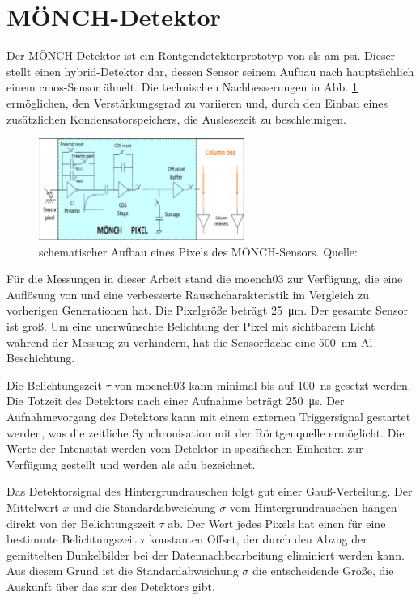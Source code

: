 \section{MÖNCH-Detektor}
\label{text:moench_theorie}
Der MÖNCH-Detektor ist ein Röntgendetektorprototyp von \gls{sls} am \gls{psi}. Dieser stellt einen hybrid-Detektor dar, dessen Sensor seinem Aufbau nach hauptsächlich einem \gls{cmos}-Sensor ähnelt. Die technischen Nachbesserungen in Abb. \ref{fig:moench_pixel} ermöglichen, den Verstärkungsgrad zu variieren und, durch den Einbau eines zusätzlichen Kondensatorspeichers, die Auslesezeit zu beschleunigen.
\begin{figure}[H]
    \centering
    \includegraphics[width=0.6\textwidth]{images/moench/paper_crop.png}
    \caption{schematischer Aufbau eines Pixels des MÖNCH-Sensors. Quelle: \cite{dinapoli_monch_2014}}
    \label{fig:moench_pixel}
\end{figure}
\noindent
Für die Messungen in dieser Arbeit stand die \gls{moench03} zur Verfügung, die eine Auflösung von  und eine verbesserte Rauschcharakteristik im Vergleich zu vorherigen Generationen hat. Die Pixelgröße beträgt \SI{25}{\micro\meter}. Der gesamte Sensor ist  groß. Um eine unerwünschte Belichtung der Pixel mit sichtbarem Licht während der Messung zu verhindern, hat die Sensorfläche eine \SI{500}{\nano\meter} Al-Beschichtung.

\noindent
Die Belichtungszeit $\tau$ von \gls{moench03} kann minimal bis auf \SI{100}{\nano\second} gesetzt werden. Die Totzeit des Detektors nach einer Aufnahme beträgt \SI{250}{\micro\second}. Der Aufnahmevorgang des Detektors kann mit einem externen Triggersignal gestartet werden, was die zeitliche Synchronisation mit der Röntgenquelle ermöglicht. Die Werte der Intensität werden vom Detektor in spezifischen Einheiten zur Verfügung gestellt und werden als \gls{adu} bezeichnet.

\noindent
Das Detektorsignal des Hintergrundrauschen folgt gut einer Gauß-Verteilung. Der Mittelwert $\bar{x}$ und die Standardabweichung $\sigma$ vom Hintergrundrauschen hängen direkt von der Belichtungszeit $\tau$ ab. Der Wert jedes Pixels hat einen für eine bestimmte Belichtungszeit $\tau$ konstanten Offset, der durch den Abzug der gemittelten Dunkelbilder bei der Datennachbearbeitung eliminiert werden kann. Aus diesem Grund ist die Standardabweichung $\sigma$ die entscheidende Größe, die Auskunft über das \gls{snr} des Detektors gibt.

